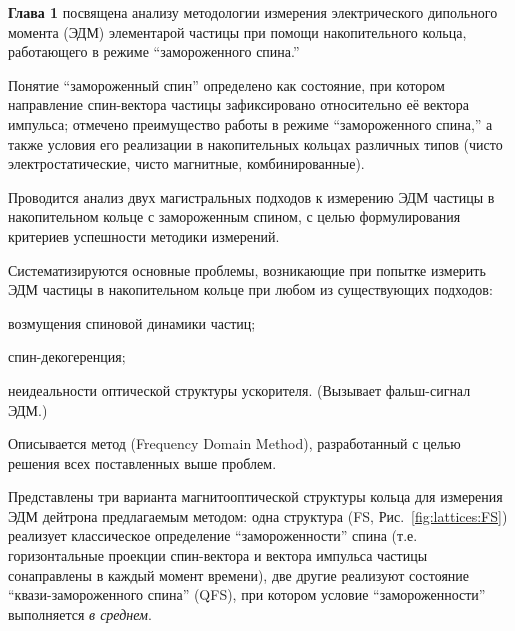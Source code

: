 
\textbf{Глава 1} посвящена анализу методологии измерения электрического дипольного момента (ЭДМ) 
элементарой частицы при помощи накопительного кольца, работающего в режиме ``замороженного спина.'' 

Понятие ``замороженный спин'' определено как состояние, при котором
направление спин-вектора частицы зафиксировано относительно её вектора импульса; 
отмечено преимущество работы в режиме ``замороженного спина,'' а также условия его реализации 
в накопительных кольцах различных типов (чисто электростатические, чисто магнитные, комбинированные).

Проводится анализ двух магистральных подходов к измерению ЭДМ частицы в накопительном кольце
с замороженным спином, с целью формулирования критериев успешности методики измерений. 

Систематизируются основные проблемы, возникающие при попытке измерить ЭДМ частицы 
в накопительном кольце при любом из существующих подходов:
\begin{enumerate*}[(1)]
	\item возмущения спиновой динамики частиц;
	\item спин-декогеренция;
	\item неидеальности оптической структуры ускорителя. (Вызывает фальш-сигнал ЭДМ.)
\end{enumerate*}

Описывается метод (Frequency Domain Method), разработанный с целью решения 
всех поставленных выше проблем.

Представлены три варианта магнитооптической структуры кольца 
для измерения ЭДМ дейтрона предлагаемым методом: одна структура (FS, Рис.~\ref{fig:lattices:FS}) 
реализует классическое определение ``замороженности'' спина (т.е. горизонтальные проекции 
спин-вектора и вектора импульса частицы сонаправлены в каждый момент времени),
две другие  реализуют состояние ``квази-замороженного спина'' (QFS), при котором условие
``замороженности'' выполняется \emph{в среднем}. 

